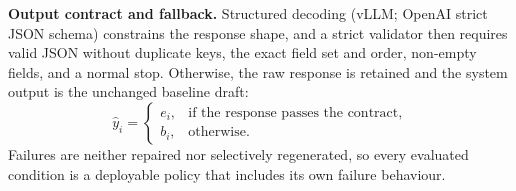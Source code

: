 \textbf{Output contract and fallback.} Structured decoding (vLLM; OpenAI strict JSON schema) constrains the response shape, and a strict validator then requires valid JSON without duplicate keys, the exact field set and order, non-empty fields, and a normal stop. Otherwise, the raw response is retained and the system output is the unchanged baseline draft:
\begin{equation}
\hat{y}_i=\begin{cases}e_i,&\text{if the response passes the contract,}\\ b_i,&\text{otherwise.}\end{cases}
\end{equation}
Failures are neither repaired nor selectively regenerated, so every evaluated condition is a deployable policy that includes its own failure behaviour.
